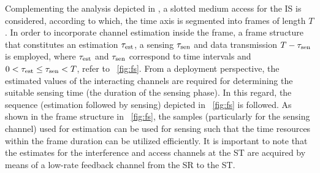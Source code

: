 Complementing the analysis depicted in \cite{Liang08}, a slotted medium access for the IS is considered, according to which, the time axis is segmented into frames of length $T$. In order to incorporate channel estimation inside the frame, a frame structure that constitutes an estimation $\tau_{\text{est}}$, a sensing $\tau_{\text{sen}}$ and data transmission $T - \tau_{\text{sen}}$ is employed, where $\tau_{\text{est}}$ and $\tau_{\text{sen}}$ correspond to time intervals and $0 < \tau_{\text{est}} \le \tau_{\text{sen}} < T$, refer to \figurename~{\ref{fig:fs}}\cite{Kaushik16}. From a deployment perspective, the estimated values of the interacting channels are required for determining the suitable sensing time (the duration of the sensing phase). In this regard, the sequence (estimation followed by sensing) depicted in \figurename~{\ref{fig:fs}} is followed.
As shown in the frame structure in \figurename~\ref{fig:fs}, the samples (particularly for the sensing channel) used for estimation can be used for sensing such that the time resources within the frame duration can be utilized efficiently. 
It is important to note that the estimates for the interference and access channels at the ST are acquired by means of a low-rate feedback channel from the SR to the ST.
 

